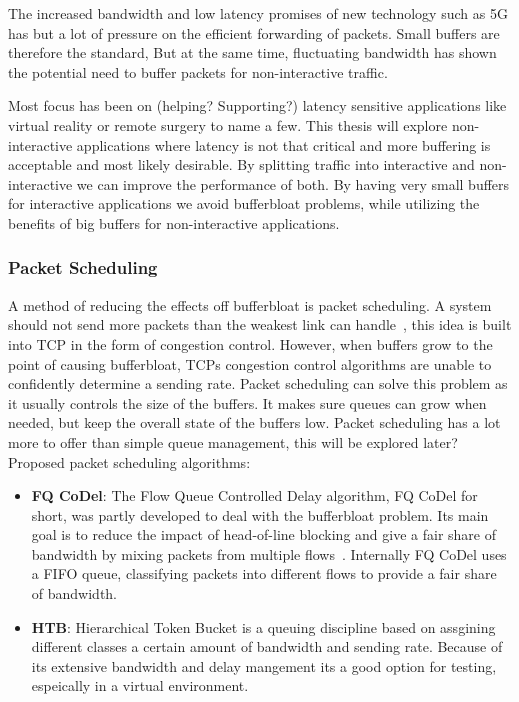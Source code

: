 \documentclass[a4paper,english, 11pt]{report}
\begin{document}
The increased bandwidth and low latency promises of new technology such as 5G has but a lot of pressure on the efficient forwarding of packets. Small buffers are therefore the standard, But at the same time, fluctuating bandwidth has shown the potential need to buffer packets for non-interactive traffic.

Most focus has been on (helping? Supporting?) latency sensitive applications like virtual reality or remote surgery to name a few. This thesis will explore non-interactive applications where latency is not that critical and more buffering is acceptable and most likely desirable. By splitting traffic into interactive and non-interactive we can improve the performance of both. By having very small buffers for interactive applications we avoid bufferbloat problems, while utilizing the benefits of big buffers for non-interactive applications.\\

\subsubsection{Packet Scheduling}
A method of reducing the effects off bufferbloat is packet scheduling. A system should not send more packets than the weakest link can handle~\cite{https://lwn.net/Articles/496509/}, this idea is built into TCP in the form of congestion control. However, when buffers grow to the point of causing bufferbloat, TCPs congestion control algorithms are unable to confidently determine a sending rate. Packet scheduling can solve this problem as it usually controls the size of the buffers. It makes sure queues can grow when needed, but keep the overall state of the buffers low. Packet scheduling has a lot more to offer than simple queue management, this will be explored later?\\

Proposed packet scheduling algorithms:
\begin{itemize}
  \item \textbf{FQ CoDel}: The Flow Queue Controlled Delay algorithm, FQ CoDel for short, was partly developed to deal with the bufferbloat problem. Its main goal is to reduce the impact of head-of-line blocking and give a fair share of bandwidth by mixing packets from multiple flows~\cite{fq_codel_rfc}. Internally FQ CoDel uses a FIFO queue, classifying packets into different flows to provide a fair share of bandwidth.
  \item \textbf{HTB}: Hierarchical Token Bucket is a queuing discipline based on assgining different classes a certain amount of bandwidth and sending rate. Because of its extensive bandwidth and delay mangement its a good option for testing, espeically in a virtual environment.
\end{itemize}
\end{document}
